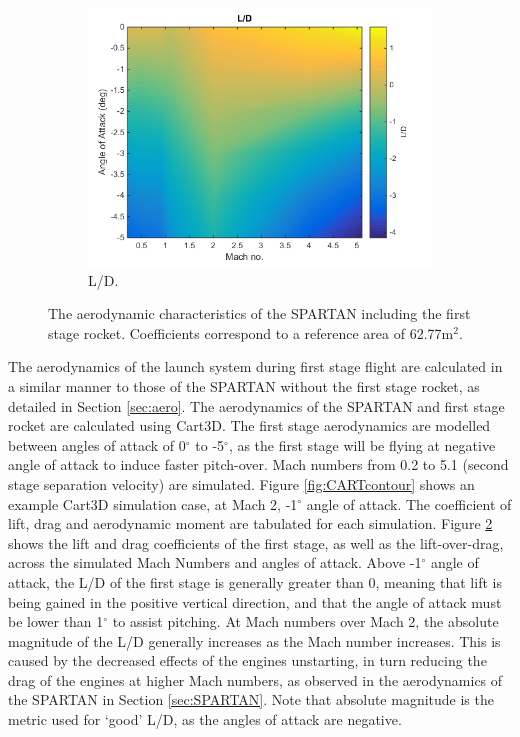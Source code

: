 \begin{figure}
\begin{subfigure}{.5\textwidth}
    		\centering
    		\includegraphics[width=0.99\linewidth]{figures/3_vehicle_design/FirstStageLD}
    		\caption{L/D.}
    		\label{fig:LD-EFirstStage}
    	\end{subfigure}
    	\caption{The aerodynamic characteristics of the SPARTAN including the first stage rocket.  Coefficients correspond to a reference area of 62.77m$^2$.}
    	\label{fig:FirstStageAero}
    \end{figure}
  The aerodynamics of the launch system during first stage flight are calculated in a similar manner to those of the SPARTAN without the first stage rocket, as detailed in Section \ref{sec:aero}. 
  The aerodynamics of the SPARTAN and first stage rocket are calculated using Cart3D. The first stage aerodynamics are modelled between angles of attack of 0$^\circ$ to -5$^\circ$, as the first stage will be flying at negative angle of attack to induce faster pitch-over. Mach numbers from 0.2 to 5.1 (second stage separation velocity) are simulated. Figure \ref{fig:CARTcontour} shows an example Cart3D simulation case, at Mach 2, -1$^\circ$ angle of attack. The coefficient of lift, drag and aerodynamic moment are tabulated for each simulation. Figure \ref{fig:FirstStageAero} shows the lift and drag coefficients of the first stage, as well as the lift-over-drag, across the simulated Mach Numbers and angles of attack. Above -1$^\circ$ angle of attack, the L/D of the first stage is generally greater than 0, meaning that lift is being gained in the positive vertical direction, and that the angle of attack must be lower than 1$^\circ$ to assist pitching.
  At Mach numbers over Mach 2, the absolute magnitude of the L/D generally increases as the Mach number increases. This is caused by the decreased effects of the engines unstarting, in turn reducing the drag of the engines at higher Mach numbers, as observed in the aerodynamics of the SPARTAN in Section \ref{sec:SPARTAN}. 
   Note that absolute magnitude is the metric used for `good' L/D, as the angles of attack are negative. 
  
